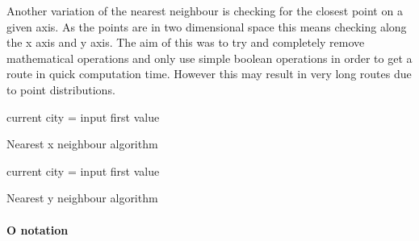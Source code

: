 \documentclass[conference,backref=page]{acmsiggraph}
\begin{document}
Another variation of the nearest neighbour is checking for the closest point on a given axis. As the points are in two dimensional space this means checking along the x axis and y axis. The aim of this was to try and completely remove mathematical operations and only use simple boolean operations in order to get a route in quick computation time. However this may result in very long routes due to point distributions.

\begin{algorithm}[h]
	current city = input first value\\
	\caption{Nearest x neighbour algorithm}
\end{algorithm}

\begin{algorithm}[h]
	current city = input first value\\
	\caption{Nearest y neighbour algorithm}
\end{algorithm}

\paragraph{O notation} \hfill
 
\end{document}
